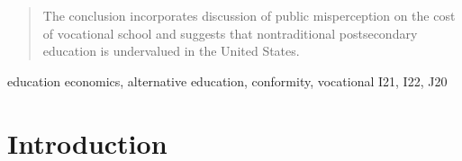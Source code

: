 \documentclass[review]{elsarticle}
\begin{document}
\begin{frontmatter}
\begin{abstract}
        The conclusion incorporates discussion of public misperception on the cost of vocational school and suggests that nontraditional postsecondary education is undervalued in the United States.
    \end{abstract}

    \begin{keyword}
        education economics, alternative education, conformity, vocational                          %
        \MSC[2010] I21, I22, J20                                                                    %
    \end{keyword}

\end{frontmatter}

\pagebreak
\linenumbers

\section{Introduction}

\end{document}
